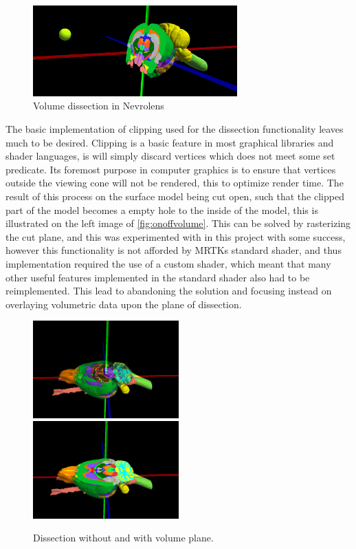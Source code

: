 \begin{figure}[H]
    \centering
    \includegraphics[width=0.7\textwidth]{fig/volumdissectionoverview.png}
    \caption{Volume dissection in Nevrolens}
\end{figure}

The basic implementation of clipping used for the dissection functionality leaves much to be desired. Clipping is a basic feature in most graphical libraries and shader languages, is will simply discard vertices which does not meet some set predicate. Its foremost purpose in computer graphics is to ensure that vertices outside the viewing cone will not be rendered, this to optimize render time. The result of this process on the surface model being cut open, such that the clipped part of the model becomes a empty hole to the inside of the model, this is illustrated on the left image of \autoref{fig:onoffvolume}. This can be solved by rasterizing the cut plane, and this was experimented with in this project with some success, however this functionality is not afforded by MRTKs standard shader, and thus implementation required the use of a custom shader, which meant that many other useful features implemented in the standard shader also had to be reimplemented. This lead to abandoning the solution and focusing instead on overlaying volumetric data upon the plane of dissection. 
\begin{figure}[hb]
    \includegraphics[width=0.5\textwidth , trim={3cm 2cm 4cm 5cm}, clip]{fig/top_mrtkdissect2.png}
    \includegraphics[width=0.5\textwidth , trim={3cm 2cm 4cm 5cm}, clip]{fig/top_volumedissect2.png}
    \caption{Dissection without and with volume plane.}
    \label{fig:onoffvolume}
\end{figure}
